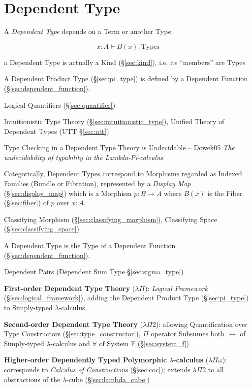 \section{Dependent Type}\label{sec:dependent_type}

A \emph{Dependent Type} depends on a Term or another Type.

\[
  x : A \vdash B(x):\mathrm{Types}
\]

a Dependent Type is actually a Kind (\S\ref{sec:kind}), i.e. its ``members'' are
Types

A Dependent Product Type (\S\ref{sec:pi_type}) is defined by a Dependent
Function (\S\ref{sec:dependent_function}).

Logical Quantifiers (\S\ref{sec:quantifier})

Intuitionistic Type Theory (\S\ref{sec:intuitionistic_type}), Unified Theory of
Dependent Types (UTT \S\ref{sec:utt})

Type Checking in a Dependent Type Theory is Undecidable -- Dowek05
\emph{The undecidability of typability in the Lambda-Pi-calculus}

Categorically, Dependent Types correspond to Morphisms regarded as
Indexed Families (Bundle or Fibration), represented by a \emph{Display
  Map} (\S\ref{sec:display_map}) which is a Morphism $p : B
\rightarrow A$ where $B(x)$ is the Fiber (\S\ref{sec:fiber}) of $p$
over $x:A$.

Classifying Morphism (\S\ref{sec:classifying_morphism}),
Classifying Space (\S\ref{sec:classifying_space})

A Dependent Type is the Type of a Dependent Function
(\S\ref{sec:dependent_function}).

Dependent Pairs (Dependent Sum Type \S\ref{sec:sigma_type})


\textbf{First-order Dependent Type Theory} ($\lambda \Pi$):
\emph{Logical Framework} (\S\ref{sec:logical_framework}), adding the
Dependent Product Type (\S\ref{sec:pi_type}) to Simply-typed
$\lambda$-calculus.


\textbf{Second-order Dependent Type Theory} ($\lambda \Pi 2$):
allowing Quantification over Type Constructors
(\S\ref{sec:type_constructor}), $\Pi$ operator Subsumes both
$\rightarrow$ of Simply-typed $\lambda$-calculus and $\forall$ of
System F (\S\ref{sec:system_f})


\textbf{Higher-order Dependently Typed Polymorphic $\lambda$-calculus}
($\lambda \Pi \omega$): corresponds to \emph{Calculus of
  Constructions} (\S\ref{sec:coc}); extends $\lambda \Pi 2$ to all
abstractions of the $\lambda$-cube (\S\ref{sec:lambda_cube})



